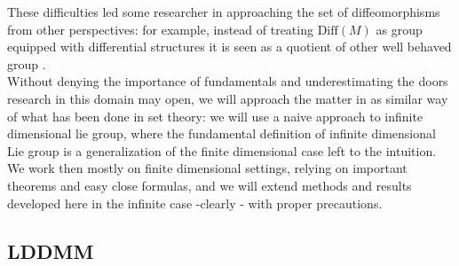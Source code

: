 These difficulties led some researcher in approaching the set of diffeomorphisms from other perspectives: for example, instead of treating $\text{Diff}(M)$ as group equipped with differential structures it is seen as a quotient of other well behaved group \cite{wojtynski1994one}.\\
Without denying the importance of fundamentals and underestimating the doors research in this domain may open, we will approach the matter in as similar way of what has been done in set theory: we will use a naive approach to infinite dimensional lie group, where the fundamental definition of infinite dimensional Lie group is a generalization of the finite dimensional case left to the intuition. 
We work then mostly on finite dimensional settings, relying on important theorems and easy close formulas, and we will extend methods and results developed here in the infinite case -clearly - with proper precautions.



\subsection{LDDMM}


